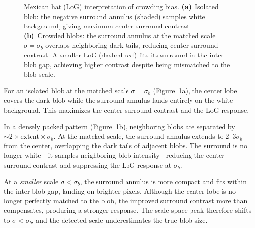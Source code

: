 \documentclass[11pt]{article}
\begin{document}
\begin{figure}[h]
\caption{Mexican hat (LoG) interpretation of crowding bias.
\textbf{(a)}~Isolated blob: the negative surround annulus (shaded)
samples white background, giving maximum center-surround contrast.
\textbf{(b)}~Crowded blobs: the surround annulus at the matched scale
$\sigma = \sigma_b$ overlaps neighboring dark tails, reducing
center-surround contrast.  A smaller LoG (dashed red) fits its surround
in the inter-blob gap, achieving higher contrast despite being
mismatched to the blob scale.}
\label{fig:crowding}
\end{figure}

\noindent
For an isolated blob at the matched scale $\sigma = \sigma_b$
(Figure~\ref{fig:crowding}a), the center lobe covers the dark blob while
the surround annulus lands entirely on the white background.  This
maximizes the center-surround contrast and the LoG response.

In a densely packed pattern (Figure~\ref{fig:crowding}b), neighboring blobs
are separated by $\sim\!2 \times \text{extent} \times \sigma_b$.  At the
matched scale, the surround annulus extends to $2$--$3\sigma_b$ from the
center, overlapping the dark tails of adjacent blobs.  The surround is no
longer white---it samples neighboring blob intensity---reducing the
center-surround contrast and suppressing the LoG response at $\sigma_b$.

At a \emph{smaller} scale $\sigma < \sigma_b$, the surround annulus is more
compact and fits within the inter-blob gap, landing on brighter pixels.
Although the center lobe is no longer perfectly matched to the blob, the
improved surround contrast more than compensates, producing a stronger
response.  The scale-space peak therefore shifts to $\sigma < \sigma_b$,
and the detected scale underestimates the true blob size.
\end{document}
